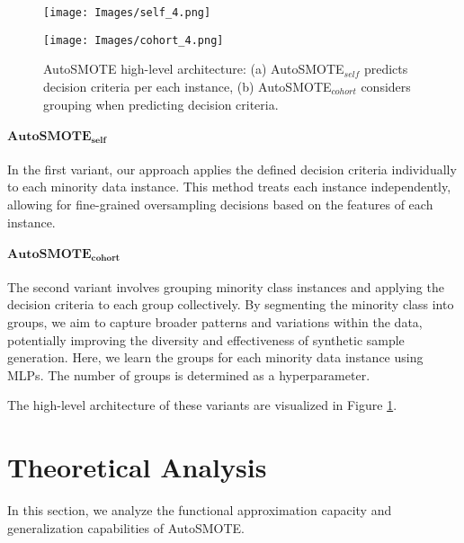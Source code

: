 \begin{figure}
    \centering
    \begin{minipage}[t]{1\textwidth}
        \centering
        \texttt{[image: Images/self\_4.png]}
    \end{minipage}
    \hfill
    \begin{minipage}[t]{1\textwidth}
        \centering
        \texttt{[image: Images/cohort\_4.png]}
    \end{minipage}
    \caption{AutoSMOTE high-level architecture: (a) AutoSMOTE$_{self}$ predicts decision criteria per each instance, (b) AutoSMOTE$_{cohort}$ considers grouping when predicting decision criteria.}
    \label{fig:architecture}
\end{figure}
\paragraph{$\mathbf{AutoSMOTE_{self}}$}In the first variant, our approach applies the defined decision criteria individually to each minority data instance. This method treats each instance independently, allowing for fine-grained oversampling decisions based on the features of each instance. 

\paragraph{$\mathbf{AutoSMOTE_{cohort}}$}The second variant involves grouping minority class instances and applying the decision criteria to each group collectively. By segmenting the minority class into groups, we aim to capture broader patterns and variations within the data, potentially improving the diversity and effectiveness of synthetic sample generation. Here, we learn the groups for each minority data instance using MLPs. The number of groups is determined as a hyperparameter.

The high-level architecture of these variants are visualized in Figure \ref{fig:architecture}.


\section{Theoretical Analysis} \label{sec:theory}

In this section, we analyze the functional approximation capacity and generalization capabilities of AutoSMOTE.

